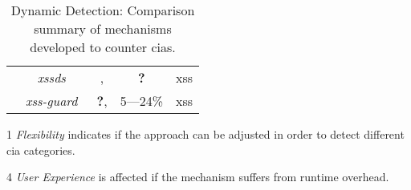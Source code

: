 \documentclass[conference]{IEEEtran}
\newcommand{\xmark}{\ding{56}}
\begin{document}
\begin{table*}
\begin{threeparttable}
\begin{small}
{\begin{tabular}{l|c|cc|c}
    & 	{\it {\sc xssds}}~\cite{JEP08}  & \xmark,\xmark & {\bf ?} &  {\sc xss} \\
    & 	{\it {\sc xss-guard}}~\cite{BV08} & {\bf ?},\xmark & 5---24\% & {\sc xss} \\
	\hline
    \end{tabular}}
    \begin{tablenotes}
	\begin{footnotesize}
       \item[1] {\it Flexibility} indicates if the approach can be adjusted
	in order to detect different {\sc cia} categories.
       \item[4] {\it User Experience} is affected if the mechanism suffers
	from runtime overhead.
	\end{footnotesize}
    \end{tablenotes}
    \caption{Dynamic Detection: Comparison summary of mechanisms developed to counter {\sc cia}s.}
    \label{tab:comp2}
    \end{small}
    \end{threeparttable}
\end{table*}



\end{document}
